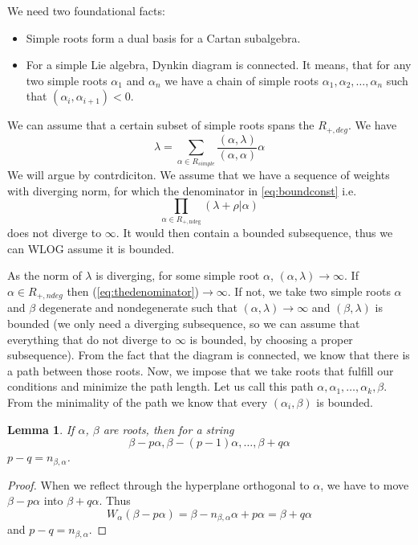\documentclass[11pt, a4paper]{article}
\newtheorem{lemma}[theorem]{Lemma}
\theoremstyle{definition}
\theoremstyle{remark}
\begin{document}
We need two foundational facts:
\begin{itemize}
    \item Simple roots form a dual basis for a Cartan subalgebra. 
    \item For a simple Lie algebra, Dynkin diagram is connected. It means, that for any two simple roots $\alpha_1$ and $\alpha_n$ we have a chain of simple roots $\alpha_1,\alpha_2,\dots,\alpha_n$ such that $(\alpha_i,\alpha_{i+1})<0$.
\end{itemize}
We can assume that a certain subset of simple roots spans the $R_{+,deg}$. We have $$   
 \lambda = \sum_{\alpha\in R_{simple}} \frac{(\alpha,\lambda)}{(\alpha,\alpha)} \alpha $$
We will argue by contrdiciton. We assume that we have a sequence of weights with diverging norm, for which the denominator in \ref{eq:boundconst} i.e. 
\begin{equation}
    \label{eq:thedenominator}
        \prod_{\alpha \in R_{+, \text{ndeg}}} (\lambda+\rho|\alpha) 
\end{equation}
does not diverge to $\infty$. It would then contain a bounded subsequence, thus we can WLOG assume it is bounded.


As the norm of $\lambda$ is diverging, for some simple root $\alpha$, $(\alpha,\lambda)\to \infty$. If $\alpha \in R_{+,ndeg}$ then (\ref{eq:thedenominator})$\to \infty$. If not, we take two simple roots $\alpha$ and $\beta$ degenerate and nondegenerate such that $(\alpha,\lambda)\to \infty$ and $(\beta,\lambda)$ is bounded (we only need a diverging subsequence, so we can assume that everything that do not diverge to $\infty$ is bounded, by choosing a proper subsequence). From the fact that the diagram is connected, we know that there is a path between those roots. Now, we impose that we take roots that fulfill our conditions and minimize the path length. Let us call this path $\alpha,\alpha_1,\dots, \alpha_k, \beta$. From the minimality of the path we know that every $(\alpha_i,\beta)$ is bounded.

\begin{lemma}
If $\alpha$, $\beta$ are roots, then for a string
$$ \beta-p\alpha, \beta-(p-1)\alpha, \dots, \beta+q\alpha $$
$p-q=n_{\beta,\alpha}$.
\end{lemma}

\begin{proof}
When we reflect through the hyperplane orthogonal to $\alpha$, we have to move $\beta-p\alpha$ into $\beta+q\alpha$. Thus
$$ W_{\alpha}(\beta-p\alpha) = \beta-n_{\beta,\alpha}\alpha+p\alpha=\beta+q\alpha $$
and $p-q=n_{\beta,\alpha}$. 
\end{proof}
\end{document}
